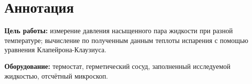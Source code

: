 \section{Аннотация}
\textbf{Цель работы:} измерение давления насыщенного пара жидкости при разной
температуре; вычисление по полученным данным теплоты испарения с помощью
уравнения Клапейрона-Клаузиуса.

\textbf{Оборудование:} термостат, герметический сосуд, заполненный исследуемой жидкостью,
отсчётный микроскоп.